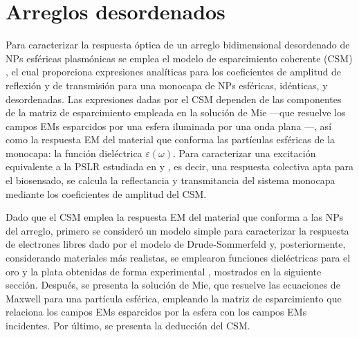 \documentclass[letterpaper,11pt] {article}
\begin{document}
	\section{Arreglos desordenados}


Para  caracterizar la respuesta óptica de un arreglo bidimensional desordenado de NPs esféricas plasmónicas se emplea el modelo de esparcimiento coherente (CSM) \cite{reyes2018analytical}, el cual proporciona expresiones analíticas para los coeficientes de amplitud de reflexión y de transmisión para una monocapa de NPs esféricas, idénticas, y desordenadas.  Las expresiones  dadas por el CSM dependen de las componentes de la matriz de esparcimiento empleada en la solución de Mie ---que resuelve los campos EMs esparcidos por una esfera iluminada por una onda plana \cite{bohren1998absorption}---, así como la respuesta EM del material que conforma las partículas esféricas de la monocapa: la función dieléctrica $\varepsilon(\omega)$.  Para caracterizar una excitación equivalente a la PSLR estudiada en \cite{kabashin2009plasmonic} y \cite{danilov2018ultra}, es decir, una respuesta colectiva apta para el biosensado, se calcula la reflectancia y transmitancia del sistema monocapa mediante los coeficientes de amplitud del CSM. 
 
Dado que el CSM emplea la respuesta EM del material que conforma a las NPs del arreglo, primero se consideró un modelo simple para caracterizar la respuesta de electrones libres dado por el modelo de Drude-Sommerfeld \cite{novotny2006principles} y, posteriormente, considerando materiales más  realistas, se emplearon funciones dieléctricas para el oro y la plata obtenidas de forma experimental \cite{johnson1972contants}, mostrados en la siguiente sección.  Después, se presenta la solución de Mie, que resuelve las ecuaciones de Maxwell para una partícula esférica, empleando la matriz de esparcimiento que relaciona los campos EMs esparcidos por la esfera con los campos EMs incidentes.  Por último, se presenta la deducción del CSM. 

\end{document}
